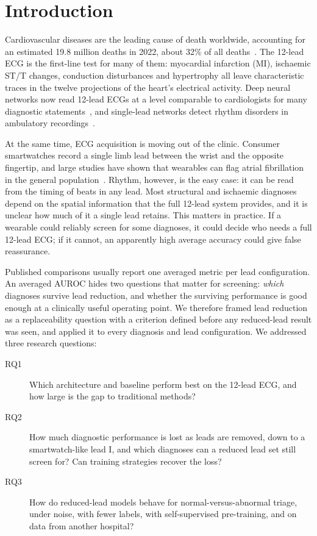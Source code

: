 \section{Introduction}
\label{sec:intro}

Cardiovascular diseases are the leading cause of death worldwide, accounting for an estimated 19.8 million deaths in 2022, about 32\% of all deaths~\cite{who_cvd}. The 12-lead ECG is the first-line test for many of them: myocardial infarction (MI), ischaemic ST/T changes, conduction disturbances and hypertrophy all leave characteristic traces in the twelve projections of the heart's electrical activity. Deep neural networks now read 12-lead ECGs at a level comparable to cardiologists for many diagnostic statements~\cite{ribeiro2020automatic,strodthoff2021benchmark}, and single-lead networks detect rhythm disorders in ambulatory recordings~\cite{hannun2019cardiologist}.

At the same time, ECG acquisition is moving out of the clinic. Consumer smartwatches record a single limb lead between the wrist and the opposite fingertip, and large studies have shown that wearables can flag atrial fibrillation in the general population~\cite{perez2019apple}. Rhythm, however, is the easy case: it can be read from the timing of beats in any lead. Most structural and ischaemic diagnoses depend on the spatial information that the full 12-lead system provides, and it is unclear how much of it a single lead retains. This matters in practice. If a wearable could reliably screen for some diagnoses, it could decide who needs a full 12-lead ECG; if it cannot, an apparently high average accuracy could give false reassurance.

Published comparisons usually report one averaged metric per lead configuration. An averaged AUROC hides two questions that matter for screening: \emph{which} diagnoses survive lead reduction, and whether the surviving performance is good enough at a clinically useful operating point. We therefore framed lead reduction as a replaceability question with a criterion defined before any reduced-lead result was seen, and applied it to every diagnosis and lead configuration. We addressed three research questions:

\begin{description}
  \item[RQ1] Which architecture and baseline perform best on the 12-lead ECG, and how large is the gap to traditional methods?
  \item[RQ2] How much diagnostic performance is lost as leads are removed, down to a smartwatch-like lead I, and which diagnoses can a reduced lead set still screen for? Can training strategies recover the loss?
  \item[RQ3] How do reduced-lead models behave for normal-versus-abnormal triage, under noise, with fewer labels, with self-supervised pre-training, and on data from another hospital?
\end{description}

